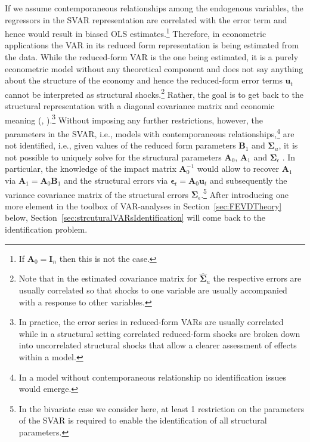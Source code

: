 \documentclass[a4paper,11pt,listof=nochaptergap,oneside,pointednumbers,bibtotoc,bigheadings,liststotoc,hidelinks]{scrbook}
\theoremstyle{mysatz}
\theoremstyle{mydefinition}
\theoremstyle{mytheorem}
\theoremstyle{mybemerkung}
\newcommand{\vect}[1]{\boldsymbol{\mathbf{#1}}}
\begin{document}
If we assume contemporaneous relationships among the endogenous variables, the regressors in the SVAR representation are correlated with the error term and hence would result in biased OLS estimates.\footnote{If $\vect{A}_0 = \vect{I}_n$ then this is not the case.} Therefore, in econometric applications the VAR in its reduced form representation is being estimated from the data. While the reduced-form VAR is the one being estimated, it is a purely econometric model without any theoretical component and does not say anything about the structure of the economy and hence the reduced-form error terms $\vect{u}_t$ cannot be interpreted as structural shocks.\footnote{Note that in the estimated covariance matrix for $\vect{\hat{\Sigma}}_u$ the respective errors are usually correlated so that shocks to one variable are usually accompanied with a response to other variables.} Rather, the goal is to get back to the structural representation with a diagonal covariance matrix and economic meaning (\citet{foroni:14}, \citet{cesa:07}).\footnote{In practice, the error series in reduced-form VARs are usually correlated while in a structural setting correlated reduced-form shocks are broken down into uncorrelated structural shocks that allow a clearer assessment of effects within a model.} Without imposing any further restrictions, however, the parameters in the SVAR, i.e., models with contemporaneous relationships,\footnote{In a model without contemporaneous relationship no identification issues would emerge.} are not identified, i.e., given values of the reduced form parameters $\vect{B}_1$ and $\vect{\Sigma}_u$, it is not possible to uniquely solve for the structural parameters $\vect{A}_0$, $\vect{A}_1$ and $\vect{\Sigma}_\epsilon$ \citep{zivot:00}. In particular, the knowledge of the impact matrix $\vect{A}_0^{-1}$ would allow to recover $\vect{A}_1$ via $\vect{A}_1 = \vect{A}_0\vect{B}_1$ and the structural errors via $\vect{\epsilon}_t = \vect{A}_0\vect{u}_t$ and subsequently the variance covariance matrix of the structural errors $\vect{\Sigma}_\epsilon$.\footnote{In the bivariate case we consider here, at least 1 restriction on the parameters of the SVAR is required to enable the identification of all structural parameters. } After introducing one more element in the toolbox of VAR-analyses in Section~\ref{sec:FEVDTheory} below, Section~\ref{sec:strcuturalVARsIdentification} will come back to the identification problem.
\end{document}
